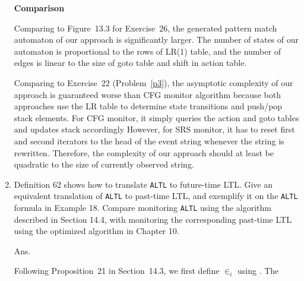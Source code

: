 \documentclass{article}
\begin{document}
\begin{enumerate}
\textbf{Comparison}

Comparing to Figure~13.3 for Exercise~26, the generated pattern match automaton
of our approach is significantly larger.
The number of states of our automaton is proportional to the rows of LR(1) table,
and the number of edges is linear to the size of goto table and shift in action table.

Comparing to Exercise~22 (Problem~\ref{p3}), the asymptotic complexity of our
approach is guaranteed worse than CFG monitor algorithm because both approaches
use the LR table to determine state transitions and push/pop stack elements.
For CFG monitor, it simply queries the action and goto tables and updates stack
accordingly
However, for SRS monitor, it has to reset first and second iterators to the head
of the event string whenever the string is rewritten.
Therefore, the complexity of our approach should at least be quadratic to the
size of currently observed string.

\newcommand{\ALTL}{\texttt{ALTL}\xspace}
\item Definition 62 shows how to translate \ALTL to future-time LTL.
Give an equivalent translation of \ALTL to past-time LTL,
and exemplify it on the \ALTL formula in Example 18.
Compare monitoring \ALTL using the algorithm described in Section 14.4,
with monitoring the corresponding past-time LTL using the optimized
algorithm in Chapter 10.

Ans.

Following Proposition~21 in Section~14.3,
we first define $\in_i$ using \ptLTL.
The 

\end{enumerate}
\end{document}
